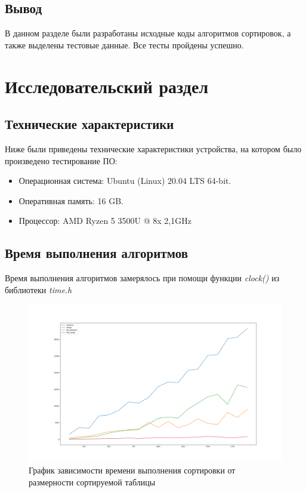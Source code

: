 \section{Вывод}

В данном разделе были разработаны исходные коды алгоритмов сортировок, а также выделены тестовые данные. Все тесты пройдены успешно.

\chapter{Исследовательский раздел}

\section{Технические характеристики}

Ниже были приведены технические характеристики устройства, на котором было произведено тестирование ПО:

\begin{itemize}
	\item Операционная система: Ubuntu (Linux) 20.04 LTS 64-bit.
	\item Оперативная память: 16 GB.
	\item Процессор: AMD Ryzen 5 3500U @ 8x 2,1GHz
\end{itemize}

\section{Время выполнения алгоритмов}

Время выполнения алгоритмов замерялось при помощи функции \textit{clock()} из библиотеки \textit{time.h}

\begin{figure}
	\includegraphics[width=\linewidth]{img/sort_time.png}
	\caption{График зависимости времени выполнения сортировки от размерности сортируемой таблицы}
\end{figure}

